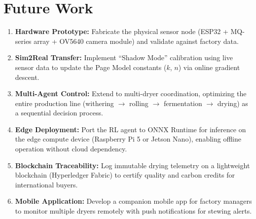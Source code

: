 ﻿\documentclass[12pt, a4paper]{report}
\begin{document}
\section{Future Work}
\begin{enumerate}
    \item \textbf{Hardware Prototype:} Fabricate the physical sensor node (ESP32 + MQ-series array + OV5640 camera module) and validate against factory data.
    \item \textbf{Sim2Real Transfer:} Implement ``Shadow Mode'' calibration using live sensor data to update the Page Model constants ($k$, $n$) via online gradient descent.
    \item \textbf{Multi-Agent Control:} Extend to multi-dryer coordination, optimizing the entire production line (withering $\to$ rolling $\to$ fermentation $\to$ drying) as a sequential decision process.
    \item \textbf{Edge Deployment:} Port the RL agent to ONNX Runtime for inference on the edge compute device (Raspberry Pi 5 or Jetson Nano), enabling offline operation without cloud dependency.
    \item \textbf{Blockchain Traceability:} Log immutable drying telemetry on a lightweight blockchain (Hyperledger Fabric) to certify quality and carbon credits for international buyers.
    \item \textbf{Mobile Application:} Develop a companion mobile app for factory managers to monitor multiple dryers remotely with push notifications for stewing alerts.
\end{enumerate}
\end{document}
